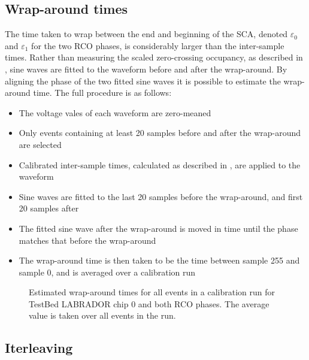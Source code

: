 \subsection{Wrap-around times}
\label{sec:calibration:LABRADOR-Digitiser-Chip:Wrap-around-times}

The time taken to wrap between the end and beginning of the SCA, denoted $\varepsilon_{0}$ and $\varepsilon_{1}$ for the two RCO phases, is considerably larger than the inter-sample times. Rather than measuring the scaled zero-crossing occupancy, as described in , sine waves are fitted to the waveform before and after the wrap-around. By aligning the phase of the two fitted sine waves it is possible to estimate the wrap-around time. The full procedure is as follows:

\begin{itemize}
\item The voltage vales of each waveform are zero-meaned
\item Only events containing at least 20 samples before and after the wrap-around are selected
\item Calibrated inter-sample times, calculated as described in , are applied to the waveform 
\item Sine waves are fitted to the last 20 samples before the wrap-around, and first 20 samples after
\item The fitted sine wave after the wrap-around is moved in time until the phase matches that before the wrap-around
\item The wrap-around time is then taken to be the time between sample 255 and sample 0, and is averaged over a calibration run
\end{itemize}


\begin{figure}[htpb]
  \hfill
  \caption{Estimated wrap-around times for all events in a calibration run for TestBed LABRADOR chip 0 and both RCO phases. The average value is taken over all events in the run.}
  \label{fig:calibration:LABRADOR-Digitiser-Chip:Wrap-around}
\end{figure}


\subsection{Iterleaving}
\label{sec:calibration:LABRADOR-Digitiser-Chip:Iterleaving}

